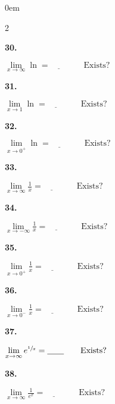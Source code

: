\documentclass[12pt,]{book}
\theoremstyle{plain}
\theoremstyle{definition}
\numberwithin{equation}{section}
\newenvironment{exercisegroup}%
{\medskip\noindent}%
{\par\bigskip}%
\newlength{\exercisegroupindent}%
\newlength{\exercisegroupitemwidth}%
\newenvironment{exercisegrouplist}%
{\vspace{-\partopsep}%
\begin{adjustwidth}{\exercisegroupindent}{0em}}%
{\end{adjustwidth}%
\vspace{-\partopsep}%
\vspace{\baselineskip}}%
\newenvironment{exercisegroupbycol}[1]%
{\begin{exercisegrouplist}%
\vspace{-\multicolsep}%
\begin{multicols}{#1}%
\setlength{\parindent}{0em}%
\setlength{\exercisegroupitemwidth}{\linewidth}}%
{\end{multicols}%
\vspace{-\multicolsep}%
\end{exercisegrouplist}}%
\newenvironment{exercisegroupitem}[1]%
{\begin{minipage}[t]{\exercisegroupitemwidth}
\vspace{0pt}%
{\bfseries#1}%
\rule{0pt}{\baselineskip}}{\strut%
\end{minipage}%
\hspace{\columnsep}}%
\providecommand\phantomsection{}
\newcommand{\fe}[2]{\mathop{{#1}{\left(#2\right)}}}
\begin{document}
\begin{exercisegroup}
\begin{exercisegroupbycol}{2}
\begin{exercisegroupitem}{30. }
\(\lim\limits_{x\to\infty}\fe{\ln}{x}=\underline{\qquad}\qquad\text{Exists?}\)%
\end{exercisegroupitem}%
\par%
\begin{exercisegroupitem}{31. }\phantomsection\hypertarget{exercise-168}{\null}
\(\lim\limits_{x\to1}\fe{\ln}{x}=\underline{\qquad}\qquad\text{Exists?}\)%
\end{exercisegroupitem}%
\par%
\begin{exercisegroupitem}{32. }\phantomsection\hypertarget{exercise-169}{\null}
\(\lim\limits_{x\to0^{+}}\fe{\ln}{x}=\underline{\qquad}\qquad\text{Exists?}\)%
\end{exercisegroupitem}%
\par%
\begin{exercisegroupitem}{33. }\phantomsection\hypertarget{exercise-170}{\null}
\(\lim\limits_{x\to\infty}\frac{1}{x}=\underline{\qquad}\qquad\text{Exists?}\)%
\end{exercisegroupitem}%
\par%
\begin{exercisegroupitem}{34. }\phantomsection\hypertarget{exercise-171}{\null}
\(\lim\limits_{x\to-\infty}\frac{1}{x}=\underline{\qquad}\qquad\text{Exists?}\)%
\end{exercisegroupitem}%
\par%
\begin{exercisegroupitem}{35. }\phantomsection\hypertarget{exercise-172}{\null}
\(\lim\limits_{x\to0^{+}}\frac{1}{x}=\underline{\qquad}\qquad\text{Exists?}\)%
\end{exercisegroupitem}%
\par%
\begin{exercisegroupitem}{36. }\phantomsection\hypertarget{exercise-173}{\null}
\(\lim\limits_{x\to0^{-}}\frac{1}{x}=\underline{\qquad}\qquad\text{Exists?}\)%
\end{exercisegroupitem}%
\par%
\begin{exercisegroupitem}{37. }\phantomsection\hypertarget{exercise-174}{\null}
\(\lim\limits_{x\to\infty}e^{\sfrac{1}{x}}=\underline{\qquad}\qquad\text{Exists?}\)%
\end{exercisegroupitem}%
\par%
\begin{exercisegroupitem}{38. }\phantomsection\hypertarget{exercise-175}{\null}
\(\lim\limits_{x\to\infty}\frac{1}{e^x}=\underline{\qquad}\qquad\text{Exists?}\)%
\end{exercisegroupitem}%

\end{exercisegroupbycol}
\end{exercisegroup}
\end{document}
